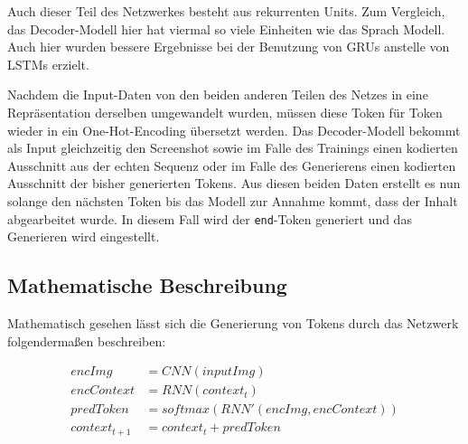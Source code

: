 \documentclass[pdftex,a4paper,halfparskip, article]{scrartcl}
\begin{document}
Auch dieser Teil des Netzwerkes besteht aus rekurrenten Units. Zum Vergleich, das Decoder-Modell hier hat viermal so viele Einheiten wie das Sprach Modell. Auch hier wurden bessere Ergebnisse bei der Benutzung von GRUs anstelle von LSTMs erzielt.

Nachdem die Input-Daten von den beiden anderen Teilen des Netzes in eine Repräsentation derselben umgewandelt wurden, müssen diese Token für Token wieder in ein One-Hot-Encoding übersetzt werden. Das Decoder-Modell bekommt als Input gleichzeitig den Screenshot sowie im Falle des Trainings einen kodierten Ausschnitt aus der echten Sequenz oder im Falle des Generierens einen kodierten Ausschnitt der bisher generierten Tokens. Aus diesen beiden Daten erstellt es nun solange den nächsten Token bis das Modell zur Annahme kommt, dass der Inhalt abgearbeitet wurde. In diesem Fall wird der \texttt{end}-Token generiert und das Generieren wird eingestellt.


\subsection{Mathematische Beschreibung}

Mathematisch gesehen lässt sich die Generierung von Tokens durch das Netzwerk folgendermaßen beschreiben:

\begin{equation}
\begin{aligned}
encImg  &= CNN(inputImg) \\
encContext &= RNN(context_t) \\
predToken &= softmax(RNN'(encImg, encContext)) \\
context_{t+1} &= context_t + predToken
\end{aligned}
\end{equation}
\end{document}
